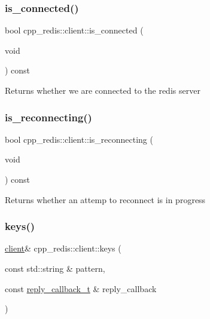 \mbox{\label{classcpp__redis_1_1client_ad3608dec2c2bfabf2c621ce14f4db37a}} 
\subsubsection{\texorpdfstring{is\+\_\+connected()}{is\_connected()}}
{\footnotesize\ttfamily bool cpp\+\_\+redis\+::client\+::is\+\_\+connected (\begin{DoxyParamCaption}\item[{void}]{ }\end{DoxyParamCaption}) const}

\begin{DoxyReturn}{Returns}
whether we are connected to the redis server 
\end{DoxyReturn}
\mbox{\label{classcpp__redis_1_1client_af03ca1aec6416ab35e6aea93c74d89d1}} 
\subsubsection{\texorpdfstring{is\+\_\+reconnecting()}{is\_reconnecting()}}
{\footnotesize\ttfamily bool cpp\+\_\+redis\+::client\+::is\+\_\+reconnecting (\begin{DoxyParamCaption}\item[{void}]{ }\end{DoxyParamCaption}) const}

\begin{DoxyReturn}{Returns}
whether an attemp to reconnect is in progress 
\end{DoxyReturn}
\mbox{\label{classcpp__redis_1_1client_acb7845a206b2321e6919c2f38282c322}} 
\subsubsection{\texorpdfstring{keys()}{keys()}\hspace{0.1cm}{\footnotesize\ttfamily [1/2]}}
{\footnotesize\ttfamily \hyperlink{classcpp__redis_1_1client}{client}\& cpp\+\_\+redis\+::client\+::keys (\begin{DoxyParamCaption}\item[{const std\+::string \&}]{pattern,  }\item[{const \hyperlink{classcpp__redis_1_1client_a061a1140d36d2eaeda82b09a0bb3f9f2}{reply\+\_\+callback\+\_\+t} \&}]{reply\+\_\+callback }\end{DoxyParamCaption})}

